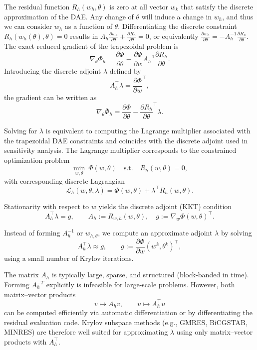 The residual function $R_h(w_h,\theta)$ is zero at all vector $w_k$ that satisfy the discrete approximation of the DAE. Any change of $\theta$ will induce a change in $w_h$, and thus we can consider $w_h$ as a function of $\theta$. Differentiating the discrete constraint
$R_h(w_h(\theta),\theta)=0$ results in $A_h \frac{\partial w_h}{\partial \theta} + \frac{\partial R_h}{\partial \theta} = 0$, or equivalently $\frac{\partial w_h}{\partial \theta} = -A_h^{-1} \frac{\partial R_h}{\partial \theta}$. The exact reduced gradient of the trapezoidal problem is
\begin{equation}
\nabla_\theta \bar\Phi_h
=
\frac{\partial \Phi}{\partial \theta}
-
\frac{\partial \Phi}{\partial w} A_h^{-1} \frac{\partial R_h}{\partial \theta}.
\end{equation}
Introducing the discrete adjoint $\lambda$ defined by
\begin{equation}
A_h^\top \lambda = \frac{\partial \Phi}{\partial w}^\top,
\end{equation}
the gradient  can be written as
\begin{equation}
\nabla_\theta \bar\Phi_h
=
\frac{\partial \Phi}{\partial \theta}
-
\frac{\partial R_h}{\partial \theta}^\top \lambda.
\end{equation}

Solving for $\lambda$ is equivalent to computing the Lagrange multiplier
associated with the trapezoidal DAE constraints and coincides with the discrete adjoint used in
sensitivity analysis. The Lagrange multiplier corresponds to the constrained optimization problem 
\[
\min_{w,\theta}\ \Phi(w,\theta)
\quad \text{s.t.}\quad
R_h(w,\theta)=0,
\]
with corresponding discrete Lagrangian
\[
\mathcal{L}_h(w,\theta,\lambda)
=
\Phi(w,\theta)
+
\lambda^\top R_h(w,\theta).
\]

Stationarity with respect to $w$ yields the discrete adjoint (KKT) condition
\[
A_h^\top \lambda = g,
\qquad
A_h := R_{w,h}(w,\theta), \quad
g := \nabla_w \Phi(w,\theta)^\top.
\]

Instead of forming $A_h^{-1}$ or $w_{h,\theta}$, we compute an approximate
adjoint $\lambda$ by solving
\begin{equation}
A_h^\top \lambda \approx g,
\qquad
g := \frac{\partial \Phi}{\partial w}(w^k,\theta^k)^\top,
\end{equation}
using a small number of Krylov iterations.

The matrix $A_h$ is typically large, sparse, and structured (block-banded in time).
Forming $A_h^{-T}$ explicitly is infeasible for large-scale problems.
However, both matrix--vector products
\[
v \mapsto A_h v,
\qquad
u \mapsto A_h^\top u
\]
can be computed efficiently via automatic differentiation or by differentiating the residual evaluation code. Krylov subspace methods (e.g., GMRES, BiCGSTAB, MINRES) are therefore well suited for approximating $\lambda$ using only matrix--vector products with $A_h^\top$.

